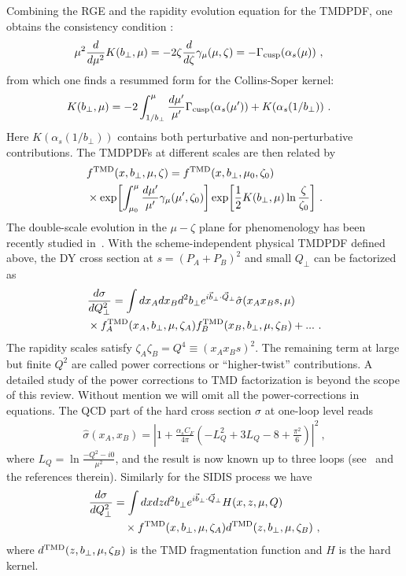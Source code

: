 Combining the RGE and the rapidity evolution equation for the TMDPDF, one obtains the consistency condition :
\begin{align}
	\mu^2 \frac{d}{d\mu^2} K(b_\perp,\mu)
	&= -2 \zeta \frac{d}{d\zeta} \gamma_\mu(\mu,\zeta) =- \Gamma_{\rm cusp}(\alpha_s(\mu)) \ ,
\end{align}
from which one finds a resummed form for the Collins-Soper kernel:
\begin{align}
	K(b_\perp,\mu) &= -2 \int_{1/b_\perp}^\mu \frac{d\mu'}{\mu'} \Gamma_{\rm cusp}(\alpha_s(\mu')) + K(\alpha_s(1/b_\perp)) \ .
\end{align}
Here $K(\alpha_s(1/b_\perp))$ contains both perturbative and non-perturbative contributions. The TMDPDFs at different scales are then related by
\begin{align} \label{eq:tmd_evolution}
	&f^{\rm TMD}(x, b_\perp, \mu, \zeta) = f^{\rm TMD}(x, b_\perp, \mu_0, \zeta_0) \\
	& \times\exp\biggl[ \int_{\mu_0}^\mu \frac{d\mu'}{\mu'} \gamma_\mu(\mu',\zeta_0) \biggr]
	\exp\biggl[ \frac12 K(b_\perp,\mu) \ln\frac{\zeta}{\zeta_0} \biggr]  \ . \nonumber
\end{align}
The double-scale evolution in the $\mu-\zeta$ plane for phenomenology has been recently studied in~\cite{Scimemi:2018xaf}.
With the scheme-independent physical TMDPDF defined above, the DY cross section at $s=(P_A+P_B)^2$ and small $Q_\perp$ can be factorized as
\begin{align}
	&\frac{d\sigma}{dQ_\perp^2}=\int dx_Adx_B d^2b_\perp e^{i\vec{b}_\perp \cdot \vec{Q}_\perp}\hat \sigma(x_Ax_Bs,\mu)\nonumber \\ &\times f_A^{\rm TMD}(x_A,b_\perp,\mu,\zeta_A)f_B^{\rm TMD}(x_B,b_\perp,\mu,\zeta_B)+ ... \ .
\end{align}
The rapidity scales satisfy $\zeta_A\zeta_B= Q^4\equiv(x_Ax_Bs)^2$. The remaining term at large but finite $Q^2$ are called power corrections or ``higher-twist'' contributions. A detailed study of the power corrections to TMD factorization is beyond the scope of this review. Without mention we will omit all the power-corrections in equations. The QCD part of the hard cross section $\hat{\sigma}$ at one-loop level reads
\begin{align}
	\hat \sigma(x_A,x_B)=\left|1+\frac{\alpha_sC_F}{4\pi}\left(-L^2_{Q}+3L_Q-8+\frac{\pi^2}{6}\right)\right|^2 \ ,
\end{align}
where $L_Q=\ln \frac{-Q^2-i0}{\mu^2}$, and the result is now known up to three loops (see~\cite{Moch:2005tm,Baikov:2009bg,Lee:2010cga,Gehrmann:2010ue} and the references therein). Similarly for the SIDIS process we have
\begin{align}
	\frac{d\sigma}{dQ_\perp^2}&=\int dxdz d^2b_\perp e^{i\vec{b}_\perp \cdot \vec{Q}_\perp}H(x,z,\mu,Q)\nonumber \\
	&\quad \times f^{\rm TMD}(x,b_\perp,\mu,\zeta_A)d^{\rm TMD}(z,b_\perp,\mu,\zeta_B) \ ,
\end{align}
where $d^{\rm TMD}(z,b_\perp,\mu,\zeta_B)$ is the TMD fragmentation function and $H$ is the hard kernel.

